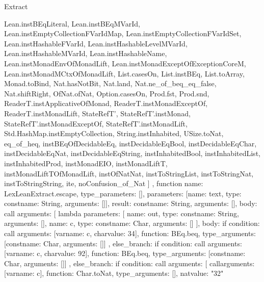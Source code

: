 \begin{lexlean}{Extract}
\begin{toolingmodule}
{{        Lean.instBEqLiteral,
        Lean.instBEqMVarId,
        Lean.instEmptyCollectionFVarIdMap,
        Lean.instEmptyCollectionFVarIdSet,
        Lean.instHashableFVarId,
        Lean.instHashableLevelMVarId,
        Lean.instHashableMVarId,
        Lean.instHashableName,
        Lean.instMonadEnvOfMonadLift,
        Lean.instMonadExceptOfExceptionCoreM,
        Lean.instMonadMCtxOfMonadLift,
        List.casesOn,
        List.instBEq,
        List.toArray,
        Monad.toBind,
        Nat.hasNotBit,
        Nat.land,
        Nat.ne_of_beq_eq_false,
        Nat.shiftRight,
        OfNat.ofNat,
        Option.casesOn,
        Prod.fst,
        Prod.snd,
        ReaderT.instApplicativeOfMonad,
        ReaderT.instMonadExceptOf,
        ReaderT.instMonadLift,
        StateRefT',
        StateRefT'.instMonad,
        StateRefT'.instMonadExceptOf,
        StateRefT'.instMonadLift,
        Std.HashMap.instEmptyCollection,
        String.instInhabited,
        USize.toNat,
        eq_of_heq,
        instBEqOfDecidableEq,
        instDecidableEqBool,
        instDecidableEqChar,
        instDecidableEqNat,
        instDecidableEqString,
        instInhabitedBool,
        instInhabitedList,
        instInhabitedProd,
        instMonadEIO,
        instMonadLiftT,
        instMonadLiftTOfMonadLift,
        instOfNatNat,
        instToStringList,
        instToStringNat,
        instToStringString,
        ite,
        noConfusion_of_Nat
      ]
    },
    function{
      name: LexLeanExtract.escape,
      type_parameters: [],
      parameters: [{name: text, type: const{name: String, arguments: []}}],
      result: const{name: String, arguments: []},
      body: call{
        arguments: [
          lambda{
            parameters: [
              {name: out, type: const{name: String, arguments: []}},
              {name: c, type: const{name: Char, arguments: []}}
            ],
            body: if{
              condition: call{
                arguments: [var{name: c}, char{value: 34}],
                function: BEq.beq,
                type_arguments: [const{name: Char, arguments: []}]
              },
              else_branch: if{
                condition: call{
                  arguments: [var{name: c}, char{value: 92}],
                  function: BEq.beq,
                  type_arguments: [const{name: Char, arguments: []}]
                },
                else_branch: if{
                  condition: call{
                    arguments: [
                      call{arguments: [var{name: c}], function: Char.toNat, type_arguments: []},
                      nat{value: "32"}
}}}}}}}}
\end{toolingmodule}
\end{lexlean}
